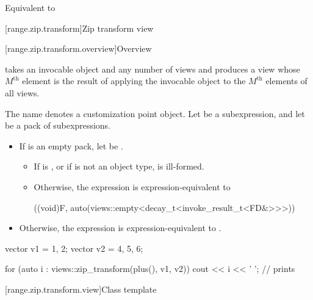 \begin{itemdescr}
\pnum
\effects
Equivalent to 
\end{itemdescr}

[range.zip.transform]{Zip transform view}

[range.zip.transform.overview]{Overview}

\pnum
{}%
 takes an invocable object and
any number of views and
produces a view
whose $M^\text{th}$ element is
the result of applying the invocable object
to the $M^\text{th}$ elements of all views.

\pnum
{}%
The name  denotes
a customization point object.
Let  be a subexpression, and
let  be a pack of subexpressions.
\begin{itemize}
\item
If  is an empty pack,
let  be .
\begin{itemize}
\item
If  is , or
if  is not an object type,
 is ill-formed.
\item
Otherwise, the expression 
is expression-equivalent to
\begin{codeblock}
((void)F, auto(views::empty<decay_t<invoke_result_t<FD&>>>))
\end{codeblock}
\end{itemize}
\item
Otherwise, the expression 
is expression-equivalent to .
\end{itemize}

\pnum
\begin{example}
\begin{codeblock}
vector v1 = {1, 2};
vector v2 = {4, 5, 6};

for (auto i : views::zip_transform(plus(), v1, v2)) {
  cout << i << ' ';     // prints 
}
\end{codeblock}
\end{example}

[range.zip.transform.view]{Class template }

